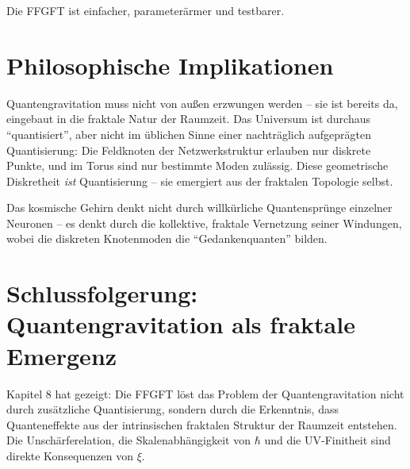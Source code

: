 \begin{center}
	\small
\end{center}
	
	Die FFGFT ist einfacher, parameterärmer und testbarer.
	
	\section{Philosophische Implikationen}
	
	Quantengravitation muss nicht von außen erzwungen werden -- sie ist bereits da, eingebaut in die fraktale Natur der Raumzeit. Das Universum ist durchaus \enquote{quantisiert}, aber nicht im üblichen Sinne einer nachträglich aufgeprägten Quantisierung: Die Feldknoten der Netzwerkstruktur erlauben nur diskrete Punkte, und im Torus sind nur bestimmte Moden zulässig. Diese geometrische Diskretheit \textit{ist} Quantisierung -- sie emergiert aus der fraktalen Topologie selbst.
	
	Das kosmische Gehirn denkt nicht durch willkürliche Quantensprünge einzelner Neuronen -- es denkt durch die kollektive, fraktale Vernetzung seiner Windungen, wobei die diskreten Knotenmoden die \enquote{Gedankenquanten} bilden.
	
	\section{Schlussfolgerung: Quantengravitation als fraktale Emergenz}
	
	Kapitel 8 hat gezeigt: Die FFGFT löst das Problem der Quantengravitation nicht durch zusätzliche Quantisierung, sondern durch die Erkenntnis, dass Quanteneffekte aus der intrinsischen fraktalen Struktur der Raumzeit entstehen. Die Unschärferelation, die Skalenabhängigkeit von \(\hbar\) und die UV-Finitheit sind direkte Konsequenzen von \(\xi\).
	
